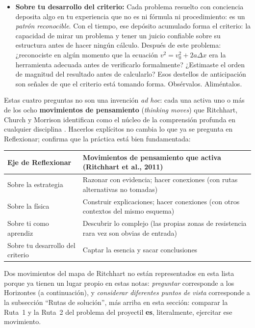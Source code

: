\documentclass[11pt]{book}
\begin{document}
\begin{enumerate}
\begin{enumerate}
\begin{itemize}
        \item {\bf Sobre tu desarrollo del criterio:} Cada problema resuelto con conciencia deposita algo en tu experiencia que no es ni fórmula ni procedimiento: es un {\it patrón reconocible}. Con el tiempo, ese depósito acumulado forma el criterio: la capacidad de mirar un problema y tener un juicio confiable sobre su estructura antes de hacer ningún cálculo. Después de este problema: ¿reconociste en algún momento que la ecuación $v^2 = v_0^2 + 2a\Delta x$ era la herramienta adecuada antes de verificarlo formalmente? ¿Estimaste el orden de magnitud del resultado antes de calcularlo? Esos destellos de anticipación son señales de que el criterio está tomando forma. Obsérvalos. Aliméntalos.
    \end{itemize}
\end{enumerate}

{\small
Estas cuatro preguntas no son una invención {\it ad hoc}: cada una activa uno o más de los ocho {\bf movimientos de pensamiento} (\textit{thinking moves}) que Ritchhart, Church y Morrison identifican como el núcleo de la comprensión profunda en cualquier disciplina \cite{Ritchhart2011}. Hacerlos explícitos no cambia lo que ya se pregunta en Reflexionar; confirma que la práctica está bien fundamentada:

\medskip
\begin{center}
\footnotesize
\begin{tabular}{p{3.4cm}p{9.5cm}}
\hline
\textbf{Eje de Reflexionar} & \textbf{Movimientos de pensamiento que activa (Ritchhart et al., 2011)} \\
\hline
Sobre la estrategia         & Razonar con evidencia; hacer conexiones (con rutas alternativas no tomadas) \\
Sobre la física              & Construir explicaciones; hacer conexiones (con otros contextos del mismo esquema) \\
Sobre ti como aprendiz       & Descubrir lo complejo (las propias zonas de resistencia rara vez son obvias de entrada) \\
Sobre tu desarrollo del criterio & Captar la esencia y sacar conclusiones \\
\hline
\end{tabular}
\end{center}

\medskip
\noindent Dos movimientos del mapa de Ritchhart no están representados en esta lista porque ya tienen un lugar propio en estas notas: {\it preguntar} corresponde a los Horizontes (a continuación), y {\it considerar diferentes puntos de vista} corresponde a la subsección ``Rutas de solución'', más arriba en esta sección: comparar la Ruta~1 y la Ruta~2 del problema del proyectil {\bf es}, literalmente, ejercitar ese movimiento.
}


\end{enumerate}
\end{document}
